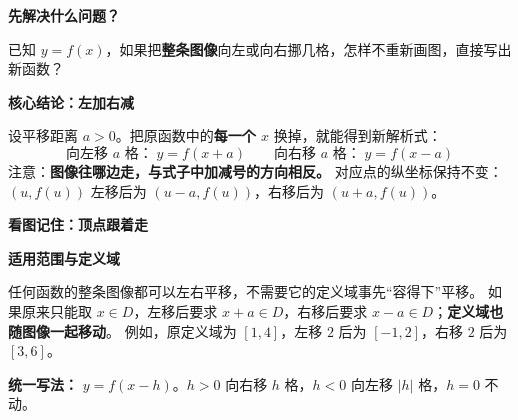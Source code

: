 \begin{statementbox}
  \textbf{\textcolor{CStatement}{先解决什么问题？}}

  已知 $y=f(x)$，如果把\textbf{整条图像}向左或向右挪几格，怎样不重新画图，直接写出新函数？

  \medskip
  \textbf{\textcolor{CStatement}{核心结论：左加右减}}

  设平移距离 $a>0$。把原函数中的\textbf{每一个 $x$} 换掉，就能得到新解析式：
  \[
    \boxed{\text{向左移 }a\text{ 格：}\;y=f(x+a)}
    \qquad
    \boxed{\text{向右移 }a\text{ 格：}\;y=f(x-a)}
  \]
  注意：\textbf{图像往哪边走，与式子中加减号的方向相反。}
  对应点的纵坐标保持不变：$(u,f(u))$ 左移后为 $(u-a,f(u))$，右移后为 $(u+a,f(u))$。

  \medskip
  \textbf{\textcolor{CStatement}{看图记住：顶点跟着走}}
  \begin{center}
  
  \end{center}

  \textbf{\textcolor{CStatement}{适用范围与定义域}}

  任何函数的整条图像都可以左右平移，不需要它的定义域事先“容得下”平移。
  如果原来只能取 $x\in D$，左移后要求 $x+a\in D$，右移后要求 $x-a\in D$；\textbf{定义域也随图像一起移动}。
  例如，原定义域为 $[1,4]$，左移 $2$ 后为 $[-1,2]$，右移 $2$ 后为 $[3,6]$。

  \textbf{统一写法：} $y=f(x-h)$。$h>0$ 向右移 $h$ 格，$h<0$ 向左移 $|h|$ 格，$h=0$ 不动。
\end{statementbox}

